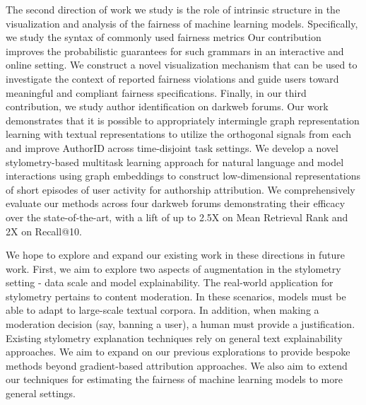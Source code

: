 The second direction of work we study is the role of intrinsic structure in the visualization and analysis of the fairness of machine learning models.
Specifically, we study the syntax of commonly used fairness metrics 
Our contribution improves the probabilistic guarantees for such grammars in an interactive and online setting.
We construct a novel visualization mechanism that can be used to investigate the context of reported fairness violations and guide users toward meaningful and compliant fairness specifications.
Finally, in our third contribution, we study author identification on darkweb forums.
Our work demonstrates that it is possible to appropriately intermingle graph representation learning with textual representations to utilize the orthogonal signals from each and improve AuthorID across time-disjoint task settings.
We develop a novel stylometry-based multitask learning approach for natural language and model interactions using graph embeddings to construct low-dimensional representations of short episodes of user activity for authorship attribution. 
We comprehensively evaluate our methods across four darkweb forums demonstrating their efficacy over the state-of-the-art, with a lift of up to 2.5X on Mean Retrieval Rank and 2X on Recall@10.


We hope to explore and expand our existing work in these directions in future work. 
First, we aim to explore two aspects of augmentation in the stylometry setting - data scale and model explainability. 
The real-world application for stylometry pertains to content moderation. 
In these scenarios, models must be able to adapt to large-scale textual corpora.
In addition, when making a moderation decision (say, banning a user), a human must provide a justification.
Existing stylometry explanation techniques rely on general text explainability approaches. 
We aim to expand on our previous explorations to provide bespoke methods beyond gradient-based attribution approaches.
We also aim to extend our techniques for estimating the fairness of machine learning models to more general settings.

\endinput